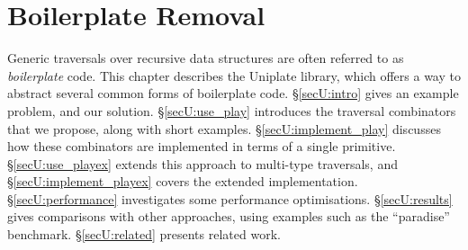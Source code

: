 


\begin{comment}
\begin{code}
class Uniplate x where
	uniplate :: x -> (Str x, Str x -> x)
\end{code}
\begin{code}
class Uniplate x where
\end{code}
\begin{code}
transform' x = transform x
\end{code}
\begin{code}
children = undefined
context = undefined
\end{code}
\end{comment}


\chapter{Boilerplate Removal}
\label{chp:uniplate}

Generic traversals over recursive data structures are often referred to as \textit{boilerplate} code. This chapter describes the Uniplate library, which offers a way to abstract several common forms of boilerplate code. \S\ref{secU:intro} gives an example problem, and our solution. \S\ref{secU:use_play} introduces the traversal combinators that we propose, along with short examples. \S\ref{secU:implement_play} discusses how these combinators are implemented in terms of a single primitive. \S\ref{secU:use_playex} extends this approach to multi-type traversals, and \S\ref{secU:implement_playex} covers the extended implementation. \S\ref{secU:performance} investigates some performance optimisations. \S\ref{secU:results} gives comparisons with other approaches, using examples such as the ``paradise'' benchmark. \S\ref{secU:related} presents related work.


